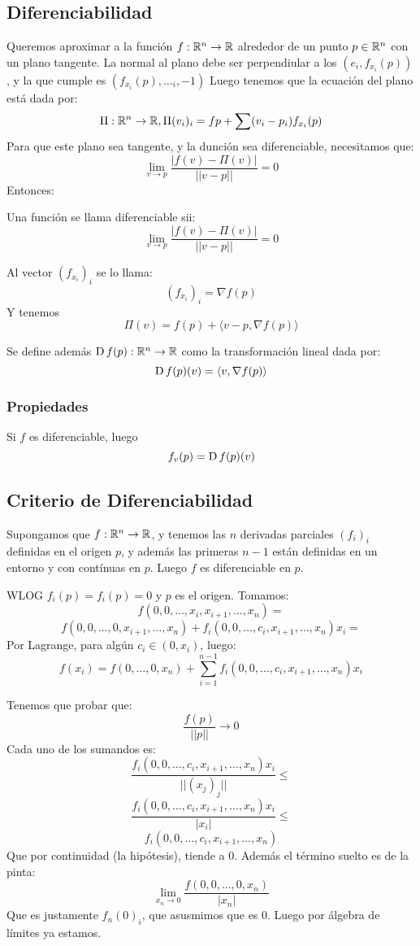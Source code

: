 \documentclass{article}
\begin{document}
    \subsection*{Diferenciabilidad}
    Queremos aproximar a la función $f : \mathbb{R}^n \to \mathbb{R}$ alrededor de un punto $p \in \mathbb{R}^n$ con un plano tangente. La normal al plano debe ser perpendiular a los $(e_i, f_{x_i}(p))$, y la que cumple es $(f_{x_i}(p), \dots_i, -1)$ Luego tenemos que la ecuación del plano está dada por:
    \[\Pi : \mathbb{R}^n \to \mathbb{R}, \Pi(v_i)_i = fp + \sum (v_i - p_i)f_{x_i}(p)\]
    Para que este plano sea tangente, y la dunción sea diferenciable, necesitamos que:
    \[
        \lim_{v \to p} \frac{|f(v) - \Pi(v)|}{||v-p||} = 0
    \]
    Entonces:
    \begin{defi}
        Una función se llama diferenciable sii:
    \[
        \lim_{v \to p} \frac{|f(v) - \Pi(v)|}{||v-p||} = 0
    \]
    \end{defi}
    Al vector $(f_{x_i})_i$ se lo llama:
    \[
        (f_{x_i})_i = \nabla f(p)
    \]
    Y tenemos
    \[\Pi(v) = f(p) + \langle v - p, \nabla f(p) \rangle\]

    Se define además $\operatorname{D} f(p) : \mathbb{R}^n \to \mathbb{R}$ como la transformación lineal dada por:
    \[
        \operatorname{D} f(p)(v) = \langle v, \nabla f(p) \rangle
    \]
    \subsubsection*{Propiedades}
    Si $f$ es diferenciable, luego
    \[
        f_v(p) = \operatorname{D} f(p)(v)
    \]
    \subsection*{Criterio de Diferenciabilidad}
    \begin{teo}
    Supongamos que $f : \mathbb{R}^n \to \mathbb{R}$, y tenemos las $n$ derivadas parciales $(f_i)_i$ definidas en el origen $p$, y además las primeras $n-1$ están definidas en un entorno y con contínuas en $p$. Luego $f$ es diferenciable en $p$.
    \end{teo}

    \begin{demo}
    WLOG $f_i(p) = f_i(p) = 0$ y $p$ es el origen.
    Tomamos:
    \[
        f(0, 0, \dots, x_i, x_{i+1}, \dots, x_n) =
    \]
    \[
        f(0, 0, \dots, 0, x_{i+1}, \dots, x_n) +
        f_i(0, 0, \dots, c_i, x_{i+1}, \dots, x_n)x_i =
    \]
    Por Lagrange, para algún $c_i \in (0, x_i)$, luego:
    \[
        f(x_i) = f(0, \dots, 0, x_n) + \sum_{i=1}^{n-1} f_i(0, 0, \dots, c_i, x_{i+1}, \dots, x_n) x_i
    \]

    Tenemos que probar que:
    \[
    \frac{f(p)}{||p||} \to 0
    \]
    Cada uno de los sumandos es:
    \[
        \frac{f_i(0, 0, \dots, c_i, x_{i+1}, \dots, x_n) x_i}{||(x_j)_j||} \leq
    \]
    \[
        \frac{f_i(0, 0, \dots, c_i, x_{i+1}, \dots, x_n) x_i}{|x_i|} \leq
    \]
    \[
        f_i(0, 0, \dots, c_i, x_{i+1}, \dots, x_n)
    \]
    Que por continuidad (la hipótesis), tiende a $0$.
    Además el término suelto es de la pinta:
    \[
        \lim_{x_n \to 0} \frac{f(0, 0, \dots, 0, x_n)}{|x_n|}
    \]
    Que es justamente $f_n(0)_i$, que asusmimos que es $0$. Luego por álgebra de límites ya estamos.
    \end{demo}
\end{document}
